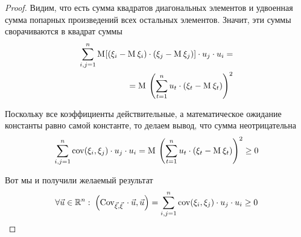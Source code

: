 \begin{enumerate}
\begin{proof}
            Видим, что есть сумма квадратов диагональных элементов
            и удвоенная сумма попарных произведений всех остальных элементов.
            Значит, эти суммы сворачиваются в квадрат суммы
            \begin{equation}\label{eq:sqrSumm}
                \begin{split}
                \sum_{i,j=1}^{n} \mathrm{M}_{}\!\left[ \left( \xi_i - \mathrm{M}_{}\,\xi_i \right)
                        \cdot \left( \xi_j - \mathrm{M}_{}\,\xi_j \right) \right]
                        \cdot u_j \cdot u_i =\\
                    = \mathrm{M}_{}\,\left( \sum_{t=1}^{n} u_t
                        \cdot \left( \xi_t - \mathrm{M}_{}\,\xi_t \right) \right)^2
                \end{split}
            \end{equation}

            Поскольку все коэффициенты действительные, а математическое
            ожидание константы равно самой константе, то делаем вывод,
            что сумма неотрицательна
            $$\sum_{i,j=1}^{n} \mathrm{cov}\!\left( \xi_i, \xi_j \right) \cdot u_j \cdot u_i
                = \mathrm{M}_{}\,\left( \sum_{t=1}^{n} u_t
                    \cdot \left( \xi_t - \mathrm{M}_{}\,\xi_t \right) \right)^2
                \ge 0$$

            Вот мы и получили желаемый результат
            $$\forall \vec{u} \in \mathbb{R}^n:\;
                \left( \mathrm{Cov}_{\vec{\xi}, \vec{\xi}}\, \cdot \vec{u}, \vec{u} \right)
                = \sum_{i,j=1}^{n} \mathrm{cov}\!\left( \xi_i, \xi_j \right) \cdot u_j \cdot u_i
                \ge 0$$
        \end{proof}
\end{enumerate}

